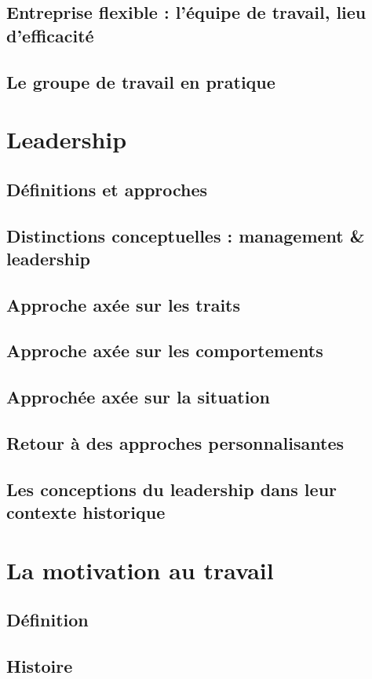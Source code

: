 \documentclass[12pt]{article}
\begin{document}
	\subsection{Entreprise flexible : l’équipe de travail, lieu d’efficacité}
	\subsection{Le groupe de travail en pratique}
		
\section{Leadership}
	\subsection{Définitions et approches}
	\subsection{Distinctions conceptuelles : management \& leadership}
	\subsection{Approche axée sur les traits}
	\subsection{Approche axée sur les comportements}
	\subsection{Approchée axée sur la situation}
	\subsection{Retour à des approches personnalisantes}
	\subsection{Les conceptions du leadership dans leur contexte historique}

\section{La motivation au travail}
	\subsection{Définition}
	\subsection{Histoire}
\end{document}
